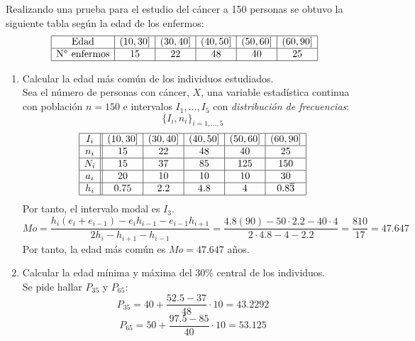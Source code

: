 \begin{ejercicio}
    Realizando una prueba para el estudio del cáncer a 150 personas se obtuvo la siguiente tabla según la edad de los enfermos:
    \begin{equation*}
        \begin{array}{|c|c|c|c|c|c|}
            \hline
            \text{Edad} & (10,30] & (30,40] & (40,50] & (50,60] & (60,90]  \\ \hline
            \text{N$^\circ$ enfermos} & 15& 22 & 48 & 40 & 25 \\ \hline 
        \end{array}
    \end{equation*}
    \begin{enumerate}
        \item Calcular la edad más común de los individuos estudiados.\\

        Sea el número de personas con cáncer, $X$, una variable estadística continua con población $n=150$ e intervalos $I_1, \dots, I_5$ con \emph{distribución de frecuencias}:
        $$\{I_i, n_i\}_{i=1, \dots, 5}$$
        \begin{equation*}
            \begin{array}{|c||c|c|c|c|c|}
                \hline
                I_i & (10,30] & (30,40] & (40,50] & (50,60] & (60,90]  \\ \hline
                n_i & 15& 22 & 48 & 40 & 25 \\ \hline 
                N_i & 15& 37 & 85 & 125 & 150 \\ \hline
                a_i & 20& 10 & 10 & 10 & 30 \\ \hline
                h_i & 0.75 & 2.2 & 4.8 & 4 & 0.8\overline{3} \\ \hline
            \end{array}
        \end{equation*}
        Por tanto, el intervalo modal es $I_3$.
        $$Mo = \frac{h_i(e_i+e_{i-1})-e_ih_{i-1} - e_{i-1}h_{i+1}}{2h_i-h_{i+1}-h_{i-1}}
        =\frac{4.8(90)-50 \cdot 2.2 - 40\cdot 4}{2\cdot 4.8-4-2.2}
        =\frac{810}{17} = 47.647$$
        Por tanto, la edad más común es $Mo = 47.647$ años.

        \item Calcular la edad mínima y máxima del 30\% central de los individuos.\\
        Se pide hallar $P_{35}$ y $P_{65}$:
        $$P_{35} = 40 + \frac{52.5-37}{48}\cdot 10 = 43.2292$$
        $$P_{65} = 50 + \frac{97.5-85}{40}\cdot 10 = 53.125$$


\end{enumerate}
\end{ejercicio}
